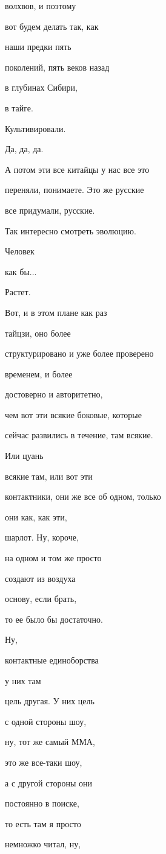 волхвов, и поэтому

вот будем делать так, как

наши предки пять

поколений, пять веков назад

в глубинах Сибири,

в тайге.

Культивировали.

Да, да, да.

А потом эти все китайцы у нас все это

переняли, понимаете. Это же русские

все придумали, русские.

Так интересно смотреть эволюцию.

Человек

как бы...

Растет.

Вот, и в этом плане как раз

тайцзи, оно более

структурировано и уже более проверено

временем, и более

достоверно и авторитетно,

чем вот эти всякие боковые, которые

сейчас развились в течение, там всякие.

Или цуань

всякие там, или вот эти

контактники, они же все об одном, только

они как, как эти,

шарлот. Ну, короче,

на одном и том же просто

создают из воздуха

основу, если брать,

то ее было бы достаточно.

Ну,

контактные единоборства

у них там

цель другая. У них цель

с одной стороны шоу,

ну, тот же самый ММА,

это же все-таки шоу,

а с другой стороны они

постоянно в поиске,

то есть там я просто

немножко читал, ну,


